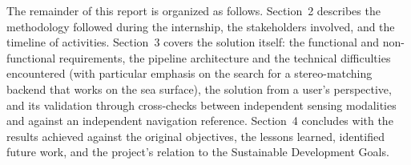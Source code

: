 The remainder of this report is organized as follows. Section~2 describes the methodology followed during the internship, the stakeholders involved, and the timeline of activities. Section~3 covers the solution itself: the functional and non-functional requirements, the pipeline architecture and the technical difficulties encountered (with particular emphasis on the search for a stereo-matching backend that works on the sea surface), the solution from a user's perspective, and its validation through cross-checks between independent sensing modalities and against an independent navigation reference. Section~4 concludes with the results achieved against the original objectives, the lessons learned, identified future work, and the project's relation to the Sustainable Development Goals.

